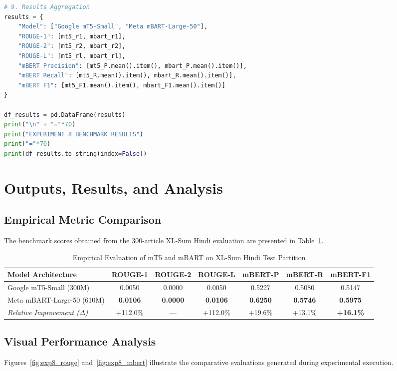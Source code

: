 \begin{lstlisting}[language=Python, caption={Complete Implementation of Experiment 8: Hindi Abstractive Summarization with mT5 and mBART}, label={lst:exp8_full}]
# 9. Results Aggregation
results = {
    "Model": ["Google mT5-Small", "Meta mBART-Large-50"],
    "ROUGE-1": [mt5_r1, mbart_r1],
    "ROUGE-2": [mt5_r2, mbart_r2],
    "ROUGE-L": [mt5_rl, mbart_rl],
    "mBERT Precision": [mt5_P.mean().item(), mbart_P.mean().item()],
    "mBERT Recall": [mt5_R.mean().item(), mbart_R.mean().item()],
    "mBERT F1": [mt5_F1.mean().item(), mbart_F1.mean().item()]
}

df_results = pd.DataFrame(results)
print("\n" + "="*70)
print("EXPERIMENT 8 BENCHMARK RESULTS")
print("="*70)
print(df_results.to_string(index=False))
\end{lstlisting}

\section{Outputs, Results, and Analysis}
\subsection{Empirical Metric Comparison}
The benchmark scores obtained from the 300-article XL-Sum Hindi evaluation are presented in Table~\ref{tab:exp8_results}.

\begin{table}[H]
\centering
\caption{Empirical Evaluation of mT5 and mBART on XL-Sum Hindi Test Partition}
\label{tab:exp8_results}
\begin{tabular}{lcccccc}
\toprule
\textbf{Model Architecture} & \textbf{ROUGE-1} & \textbf{ROUGE-2} & \textbf{ROUGE-L} & \textbf{mBERT-P} & \textbf{mBERT-R} & \textbf{mBERT-F1} \\
\midrule
Google mT5-Small (300M) & 0.0050 & 0.0000 & 0.0050 & 0.5227 & 0.5080 & 0.5147 \\
Meta mBART-Large-50 (610M) & \textbf{0.0106} & \textbf{0.0000} & \textbf{0.0106} & \textbf{0.6250} & \textbf{0.5746} & \textbf{0.5975} \\
\midrule
\textit{Relative Improvement ($\Delta$)} & +112.0\% & --- & +112.0\% & +19.6\% & +13.1\% & \textbf{+16.1\%} \\
\bottomrule
\end{tabular}
\end{table}

\subsection{Visual Performance Analysis}
Figures~\ref{fig:exp8_rouge} and~\ref{fig:exp8_mbert} illustrate the comparative evaluations generated during experimental execution.

